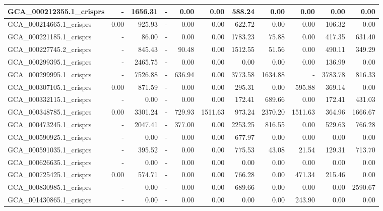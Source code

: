 \documentclass[12pt,a4paper]{article}
\begin{document}
\begin{table}[ht]
\begin{center}
\begin{tabular}{|l*{10}{|r}|}
GCA\_000212355.1\_crisprs & - & 1656.31 & - & 0.00 & 0.00 & 588.24 & 0.00 & 0.00 & 0.00 & 0.00 \\ \hline
GCA\_000214665.1\_crisprs & 0.00 & 925.93 & - & 0.00 & 0.00 & 622.72 & 0.00 & 0.00 & 106.32 & 0.00 \\ \hline
GCA\_000221185.1\_crisprs & - & 86.00 & - & 0.00 & 0.00 & 1783.23 & 75.88 & 0.00 & 417.35 & 631.40 \\ \hline
GCA\_000227745.2\_crisprs & - & 845.43 & - & 90.48 & 0.00 & 1512.55 & 51.56 & 0.00 & 490.11 & 349.29 \\ \hline
GCA\_000299395.1\_crisprs & - & 2465.75 & - & 0.00 & 0.00 & 0.00 & 0.00 & 0.00 & 136.99 & 0.00 \\ \hline
GCA\_000299995.1\_crisprs & - & 7526.88 & - & 636.94 & 0.00 & 3773.58 & 1634.88 & - & 3783.78 & 816.33 \\ \hline
GCA\_000307105.1\_crisprs & 0.00 & 871.59 & - & 0.00 & 0.00 & 295.31 & 0.00 & 595.88 & 369.14 & 0.00 \\ \hline
GCA\_000332115.1\_crisprs & - & 0.00 & - & 0.00 & 0.00 & 172.41 & 689.66 & 0.00 & 172.41 & 431.03 \\ \hline
GCA\_000348785.1\_crisprs & 0.00 & 3301.24 & - & 729.93 & 1511.63 & 973.24 & 2370.20 & 1511.63 & 364.96 & 1666.67 \\ \hline
GCA\_000473245.1\_crisprs & - & 2047.41 & - & 377.00 & 0.00 & 2253.25 & 816.55 & 0.00 & 529.63 & 766.28 \\ \hline
GCA\_000590925.1\_crisprs & - & 0.00 & - & 0.00 & 0.00 & 677.97 & 0.00 & 0.00 & 0.00 & 0.00 \\ \hline
GCA\_000591035.1\_crisprs & - & 395.52 & - & 0.00 & 0.00 & 775.53 & 43.08 & 21.54 & 129.31 & 713.70 \\ \hline
GCA\_000626635.1\_crisprs & - & 0.00 & - & 0.00 & 0.00 & 0.00 & 0.00 & 0.00 & 0.00 & 0.00 \\ \hline
GCA\_000725425.1\_crisprs & 0.00 & 574.71 & - & 0.00 & 0.00 & 766.28 & 0.00 & 471.34 & 215.46 & 0.00 \\ \hline
GCA\_000830985.1\_crisprs & - & 0.00 & - & 0.00 & 0.00 & 689.66 & 0.00 & 0.00 & 0.00 & 2590.67 \\ \hline
GCA\_001430865.1\_crisprs & - & 0.00 & - & 0.00 & 0.00 & 0.00 & 0.00 & 243.90 & 0.00 & 0.00 \\ \hline
\end{tabular}
\end{center}
\end{table}
\end{document}

